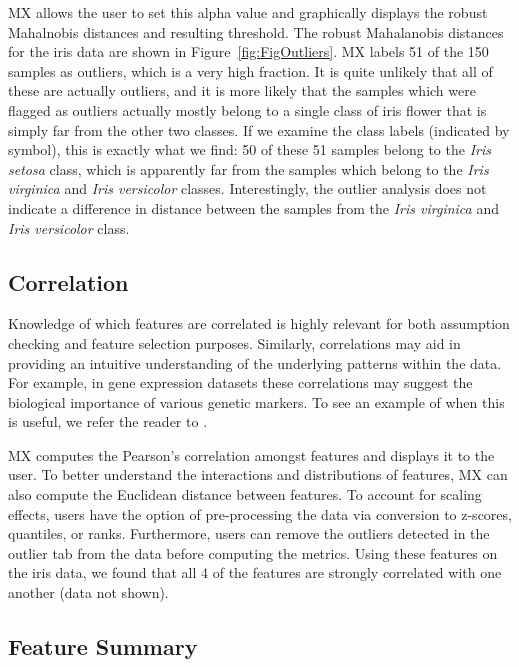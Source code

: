 \documentclass[twoside,leqno,twocolumn]{article}
\begin{document}
MX allows the user to set this alpha value and graphically displays the robust Mahalnobis distances and resulting threshold. The robust Mahalanobis distances for the iris data are shown in Figure~\ref{fig:FigOutliers}. MX labels 51 of the 150 samples as outliers, which is a very high fraction. It is quite unlikely that all of these are actually outliers, and it is more likely that the samples which were flagged as outliers actually mostly belong to a single class of iris flower that is simply far from the other two classes. If we examine the class labels (indicated by symbol), this is exactly what we find: 50 of these 51 samples belong to the \textit{Iris setosa} class, which is apparently  far from the samples which belong to the \textit{Iris virginica} and \textit{Iris versicolor} classes. Interestingly, the outlier analysis does not indicate a difference in distance between the samples from the \textit{Iris virginica} and \textit{Iris versicolor} class. 

\subsection{Correlation}
\label{subsec:SubSecCorrelation}

Knowledge of which features are correlated is highly relevant for both assumption checking and feature selection purposes. Similarly, correlations may aid in providing an intuitive understanding of the underlying patterns within the data. For example, in gene expression datasets these correlations may suggest the biological importance of various genetic markers. To see an example of when this is useful, we refer the reader to \cite{shi2012unsupervised}.

MX computes the Pearson's correlation amongst features and displays it to the user. To better understand the interactions and distributions of features, MX can also compute the Euclidean distance between features. To account for scaling effects, users have the option of pre-processing the data via conversion to z-scores, quantiles, or ranks. Furthermore, users can remove the outliers detected in the outlier tab from the data before computing the metrics. Using these features on the iris data, we found that all 4 of the features are strongly correlated with one another (data not shown).

\subsection{Feature Summary}
\label{subsec:SubSecFeature}
\end{document}
